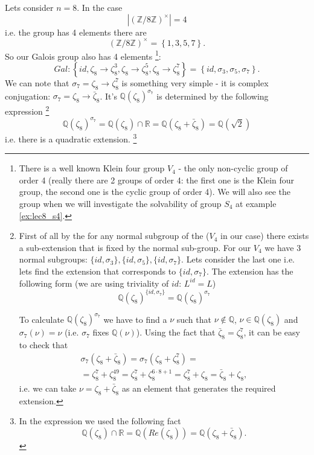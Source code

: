 \begin{example}[$n=8$]
  Lets consider $n = 8$. In the case
  \[
  \left|\left(\mathbb{Z}/8\mathbb{Z}\right)^\times\right| = 4
  \]
  i.e. the group has 4 elements there are
  \[
  \left(\mathbb{Z}/8\mathbb{Z}\right)^\times =
  \left\{
  1,3,5,7
  \right\}.
  \]
  So our Galois group also has 4 elements
  \footnote{
    There is a well known Klein four group $V_4$ \cite{wiki:klein4group} -
    the only non-cyclic group of order 4 (really there are 2 groups of
    order 4: the first one is the Klein four group, the second one is
    the cyclic group of order 4). We will also see the group when we
    will investigate the solvability of group $S_4$ at example
    \ref{ex:lec8_s4}. 
  }:
  \[
  Gal: \left\{
  id, \zeta_8 \to \zeta_8^3,
  \zeta_8 \to \zeta_8^5, \zeta_8 \to \zeta_8^7
  \right\} =
  \left\{
  id, \sigma_3, \sigma_5, \sigma_7
  \right\}.
  \]
  We can note that $\sigma_7 = \zeta_8 \to \zeta_8^7$ is something
  very simple - it is complex conjugation:
  $\sigma_7 = \zeta_8 \to \bar{\zeta}_8$. It's
   $\mathbb{Q}\left(\zeta_8\right)^{\sigma_7}$
  is determined by the following expression
  \footnote{
    First of all by the  for
    any normal subgroup of the  ($V_4$ in our
    case) there exists a sub-extension that is fixed by the normal
    sub-group. For our $V_4$      we have 3 normal subgroups:
    $\{id, \sigma_3\}, \{id, \sigma_5\}, \{id, \sigma_7\}$. Lets
    consider the last one i.e. lets find the extension that corresponds
    to $\{id, \sigma_7\}$. The extension has the following form (we
    are using triviality of $id$: $L^{id} = L$)
    \[
    \mathbb{Q}\left(\zeta_8\right)^{\{id, \sigma_7\}} =
    \mathbb{Q}\left(\zeta_8\right)^{\sigma_7}
    \]

    To calculate $\mathbb{Q}\left(\zeta_8\right)^{\sigma_7}$ we have
    to find a  $\nu$ such
    that $\nu \notin \mathbb{Q}$, $\nu \in
    \mathbb{Q}\left(\zeta_8\right)$ and $\sigma_7\left(\nu\right) =
    \nu$ (i.e. $\sigma_7$ fixes $\mathbb{Q}\left(\nu\right)$).
    Using the fact that $\bar{\zeta}_8 = \zeta_8^7$, it can
    be easy to check that
    \begin{eqnarray}
      \sigma_7\left(\zeta_8 + \bar{\zeta}_8\right) =
      \sigma_7\left(\zeta_8 + \zeta_8^7\right) =
      \nonumber \\
      =
      \zeta_8^7 + \zeta_8^{49} =
      \zeta_8^7 + \zeta_8^{6 \cdot 8 + 1} =
      \zeta_8^7 + \zeta_8 = \bar{\zeta}_8 + \zeta_8,
      \nonumber
    \end{eqnarray}
    i.e. we can take $\nu = \zeta_8 + \bar{\zeta}_8$ as an element
    that generates the required extension.
  }
  \[
  \mathbb{Q}\left(\zeta_8\right)^{\sigma_7} =
  \mathbb{Q}\left(\zeta_8\right) \cap \mathbb{R} =
  \mathbb{Q}\left(\zeta_8 + \bar{\zeta}_8\right) =
  \mathbb{Q}\left(\sqrt{2}\right)
  \]
  i.e. there is a quadratic extension.
  \footnote{
    In the expression we used the following fact
    \[
    \mathbb{Q}\left(\zeta_8\right) \cap \mathbb{R} =
    \mathbb{Q}\left(Re\left(\zeta_8\right)\right) =
    \mathbb{Q}\left(\zeta_8 + \bar{\zeta}_8\right).
    \]
  }



\end{example}
